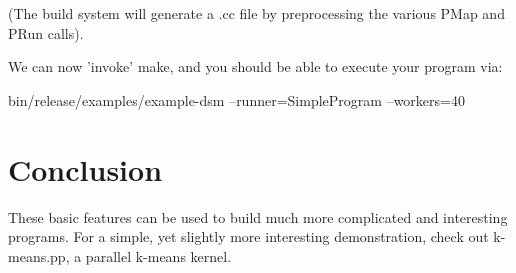 \documentclass[10pt]{article}
\begin{document}
(The build system will generate a .cc file by preprocessing the various PMap and
PRun calls).

We can now 'invoke' make, and you should be able to execute your program via:

{\ttfamily  bin/release/examples/example-dsm --runner=SimpleProgram --workers=40}


\section{Conclusion}
These basic features can be used to build much more complicated and interesting
programs.  For a simple, yet slightly more interesting demonstration, check out
k-means.pp, a parallel k-means kernel.
\end{document}

